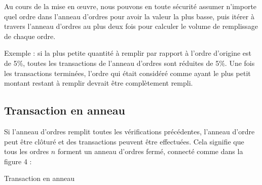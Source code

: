 \documentclass[UTF8,nofonts]{article}
\makeatletter
\newenvironment{figurehere}
 {\def\@captype{figure}}
 {}
\makeatother
\begin{document}
\begin{multicols}{2}
Au cours de la mise en œuvre, nous pouvons en toute sécurité assumer n'importe quel ordre dans l'anneau d'ordres pour avoir la valeur la plus basse, puis itérer à travers l'anneau d'ordres au plus deux fois pour calculer le volume de remplissage de chaque ordre. 

Exemple : si la plus petite quantité à remplir par rapport à l'ordre d'origine est de 5\%, toutes les transactions de l'anneau d'ordres sont réduites de 5\%. Une fois les transactions terminées, l'ordre qui était considéré comme ayant le plus petit montant restant à remplir devrait être complètement rempli.

\subsection{Transaction en anneau\label{sec:settlement}}

Si l'anneau d'ordres remplit toutes les vérifications précédentes, l'anneau d'ordre peut être clôturé et des transactions peuvent être effectuées. Cela signifie que tous les ordres $n$ forment un anneau d'ordres fermé, connecté comme dans la figure 4 :

\begin{center}
\begin{figurehere}
\centering
{}
\caption{Transaction en anneau}
\label{fig:settlement}
\end{figurehere}
\end{center}


\end{multicols}
\end{document}

